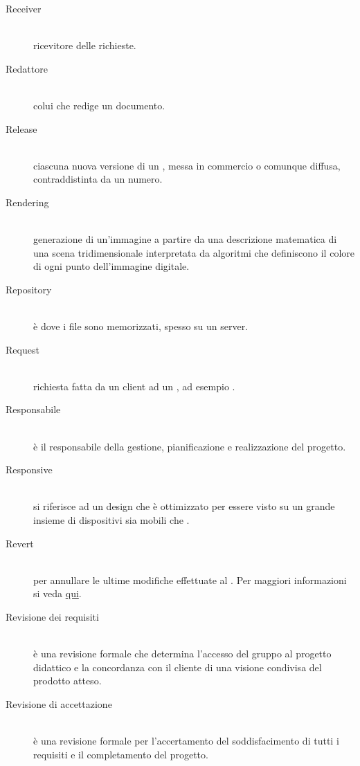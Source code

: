 \documentclass[12pt,a4paper]{article}
\begin{document}
\begin{description}
	
\item[Receiver] 
\hfill\\ricevitore delle richieste.	
	
\item[Redattore] 
\hfill\\colui che redige un documento.

\item[Release] 
\hfill\\ciascuna nuova versione di un , messa in commercio o comunque diffusa, contraddistinta da un numero.

\item[Rendering] 
\hfill\\generazione di un'immagine a partire da una descrizione matematica di una scena tridimensionale interpretata da algoritmi che definiscono il colore di ogni punto dell'immagine digitale.

\item[Repository] 
\hfill\\è dove i file sono memorizzati, spesso su un server.

\item[Request] 
\hfill\\richiesta fatta da un client ad un , ad esempio .

\item[Responsabile] 
\hfill\\è il responsabile della gestione, pianificazione e realizzazione del progetto.

\item[Responsive] 
\hfill\\si riferisce ad un design che è ottimizzato per essere visto su un grande insieme di dispositivi sia mobili che .

\item[Revert] 
\hfill\\per annullare le ultime modifiche effettuate al . Per maggiori informazioni si veda \href{https://git-scm.com/docs/}{qui}.

\item[Revisione dei requisiti] 
\hfill\\è una revisione formale che determina l'accesso del gruppo al progetto didattico e la concordanza con il cliente di una visione condivisa del prodotto atteso.

\item[Revisione di accettazione] 
\hfill\\è una revisione formale per l'accertamento del soddisfacimento di tutti i requisiti e il completamento del progetto.


\end{description}
\end{document}
